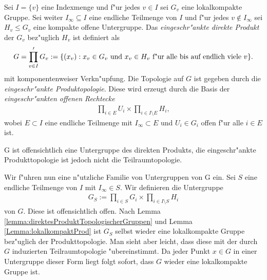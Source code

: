 		\begin{defi}
			Sei $I=\{v\}$ eine Indexmenge und f"ur jedes $v \in I$ sei $G_v$ eine lokalkompakte Gruppe. 
			Sei weiter $I_\infty \subseteq I$ eine endliche Teilmenge von $I$ und f"ur jedes $v \notin I_\infty$ sei $H_v\leq G_v$ eine kompakte offene Untergruppe. 
			Das \emph{eingeschr"ankte direkte Produkt} der $G_v$ bez"uglich $H_v$ ist definiert als 
			\begin{align*}
				G = \prod\limits_{v \in I}' G_v := \{ (x_v): x_v \in G_v \text{ und } x_v \in H_v \text{ f"ur alle bis auf endlich viele } v \}.
			\end{align*}
			mit komponentenweiser Verkn"upfung. Die Topologie auf $G$ ist gegeben durch die \emph{eingeschr"ankte Produktopologie}. Diese wird erzeugt durch die Basis der \emph{eingeschr"ankten offenen Rechtecke}
			\begin{align*}
				\prod_{i \in E} U_i \times \prod_{i \in I\setminus E} H_i,
			\end{align*}
			wobei $E \subset I$ eine endliche Teilmenge mit $I_\infty \subset E$ und $U_i \in G_i$ offen f"ur alle $i \in E$ ist.
		\end{defi}
		G ist offensichtlich eine Untergruppe des direkten Produkts, die eingeschr"ankte Produkttopologie ist jedoch nicht die Teilraumtopologie.
		
		Wir f"uhren nun eine n"utzliche Familie von Untergruppen von G ein. Sei $S$ eine endliche Teilmenge von $I$ mit $I_\infty \in S$. Wir definieren die Untergruppe
		\begin{align*}
			G_S := \prod_{i \in S}G_i \times \prod_{i \in I\setminus S} H_i
		\end{align*}
		von $G$. Diese ist offensichtlich offen. Nach Lemma \ref{lemma:direktesProduktTopologischerGruppen} und Lemma \ref{Lemma:lokalkompaktProd} ist $G_S$ selbst wieder eine lokalkompakte Gruppe bez"uglich der Produkttopologie. Man sieht aber leicht, dass diese mit der durch $G$ induzierten Teilraumtopologie "ubereinstimmt. Da jeder Punkt $x \in G$ in einer Untergruppe dieser Form liegt folgt sofort, dass $G$ wieder eine lokalkompakte Gruppe ist.
		
